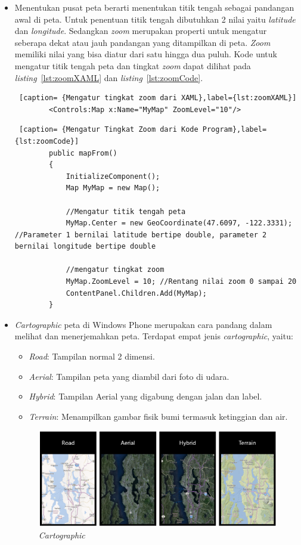 \begin{itemize}
	\item Menentukan pusat peta berarti menentukan titik tengah sebagai pandangan awal di peta. Untuk penentuan titik tengah dibutuhkan 2 nilai yaitu \textit{latitude} dan \textit{longitude}. Sedangkan \textit{zoom} merupakan properti untuk mengatur seberapa dekat atau jauh pandangan yang ditampilkan di peta. \textit{Zoom} memiliki nilai yang bisa diatur dari satu hingga dua puluh. Kode untuk mengatur titik tengah peta dan tingkat \textit{zoom} dapat dilihat pada \textit{listing}~\ref{lst:zoomXAML} dan \textit{listing}~\ref{lst:zoomCode}.\\
	
	\begin{lstlisting} [caption= {Mengatur tingkat zoom dari XAML},label={lst:zoomXAML}]
		<Controls:Map x:Name="MyMap" ZoomLevel="10"/>
	\end{lstlisting}

	\begin{lstlisting} [caption= {Mengatur Tingkat Zoom dari Kode Program},label={lst:zoomCode}]
		public mapFrom()
		{
			InitializeComponent();
			Map MyMap = new Map();

			//Mengatur titik tengah peta
			MyMap.Center = new GeoCoordinate(47.6097, -122.3331); //Parameter 1 bernilai latitude bertipe double, parameter 2 bernilai longitude bertipe double

			//mengatur tingkat zoom
			MyMap.ZoomLevel = 10; //Rentang nilai zoom 0 sampai 20
			ContentPanel.Children.Add(MyMap);
		}
	\end{lstlisting}

	
	\item \textit{Cartographic} peta di Windows Phone merupakan cara pandang dalam melihat dan menerjemahkan peta. Terdapat empat jenis \textit{cartographic}, yaitu:
		
		\begin{itemize}
			\item \textit{Road}: Tampilan normal 2 dimensi.
			\item \textit{Aerial}: Tampilan peta yang diambil dari foto di udara.
			\item \textit{Hybrid}: Tampilan Aerial yang digabung dengan jalan dan label.
			\item \textit{Terrain}: Menampilkan gambar fisik bumi termasuk ketinggian dan air.
		\end{itemize}
		
		\begin{figure}[h]
			\centering
				\includegraphics[scale=0.5]{Gambar/kartografi}
			\caption{\textit{Cartographic}\cite{MSDN}}
			\label{fig:cartographic}
		\end{figure}
		

\end{itemize}
